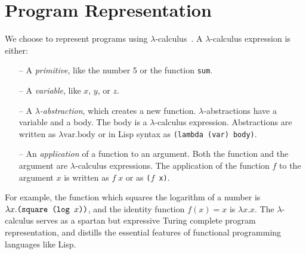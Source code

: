 \documentclass{article}
\begin{document}
\begin{figure}[h]

\end{figure}

\section{Program Representation}\label{programrepresentation}
We choose to represent programs using $\lambda$-calculus~\cite{pierce}.
A $\lambda$-calculus expression is either:
\begin{itemize}
  \item[--] A \emph{primitive}, like the number 5 or the function \texttt{sum}.
  \item[--] A \emph{variable}, like $x$, $y$, or $z$.
  \item[--] A $\lambda$\emph{-abstraction}, which creates a new function.  $\lambda$-abstractions have a variable and a body. The body is a $\lambda$-calculus expression. Abstractions are written as $\lambda \text{var}. \text{body}$ or in Lisp syntax as \mbox{\texttt{(lambda (\textrm{var}) \textrm{body})}}.
  \item[--] An \emph{application} of a function to an argument. Both the function and the argument are $\lambda$-calculus expressions. The application of the function $f$ to the argument $x$ is written as $f\; x$ or as \texttt{($f$ x)}.
\end{itemize}

For example, the function which squares the logarithm of a number is
$\lambda x.\text{\tt(square (log $x$))}$, and the identity function $f(x) = x$ is $\lambda x.x$. The
$\lambda$-calculus serves as a spartan but expressive Turing complete
program representation, and distills the essential features of functional
programming languages like Lisp.
\end{document}
